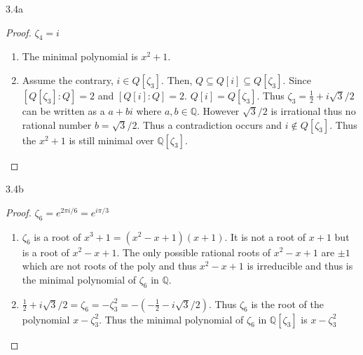 \documentclass{article}
\newcommand{\Q}{\mathbb{Q}}
\begin{document}
\begin{PROB}{3.4a}\label{Problem 3.4a.}

\end{PROB}
\begin{proof}
    $\zeta_4 = i$
    \begin{enumerate}
        \item The minimal polynomial is $x^2 + 1$. 
        \item Assume the contrary, $i \in Q[\zeta_3]$. Then, $Q \subseteq Q[i] \subseteq Q[\zeta_3]$. Since $\left[Q[\zeta_3] : Q\right] = 2$ and $\left[Q[i] : Q\right] = 2$. $Q[i] = Q[\zeta_3]$. Thus $\zeta_3 = \frac{1}{2} + i\sqrt{3}/2$ can be written as a $a + bi$ where $a, b \in \Q$. However $\sqrt{3} / 2$ is irrational thus no rational number $b = \sqrt{3} / 2$. Thus a contradiction occurs and $i \not \in Q[\zeta_3]$. Thus the $x^2 + 1$ is still minimal over $\Q[\zeta_3]$.            
    \end{enumerate}
\end{proof}

\begin{PROB}{3.4b}\label{Problem 3.4b.}

\end{PROB}
\begin{proof}
    $\zeta_6 = e^{2 \pi i / 6} = e^{i \pi/ 3}$
    \begin{enumerate}
        \item $\zeta_6$ is a root of $x^3 + 1 = (x^2 - x + 1)(x + 1)$. It is not a root of $x + 1$ but is a root of $x^2 - x + 1$. The only possible rational roots of $x^2 - x + 1$ are $\pm 1$ which are not roots of the poly and thus $x^2 - x + 1$ is irreducible and thus is the minimal polynomial of $\zeta_6$ in $\Q$.            
        \item $\frac{1}{2} + i\sqrt{3}/2 = \zeta_6 = - \zeta_3^2 =-(-\frac{1}{2} - i \sqrt{3}/2)$. Thus $\zeta_6$ is the root of the polynomial $x - \zeta_3^2$. Thus the minimal polynomial of $\zeta_6$ in $\Q[\zeta_3]$ is $x - \zeta_3^2$                    
    \end{enumerate}
\end{proof}
\end{document}
